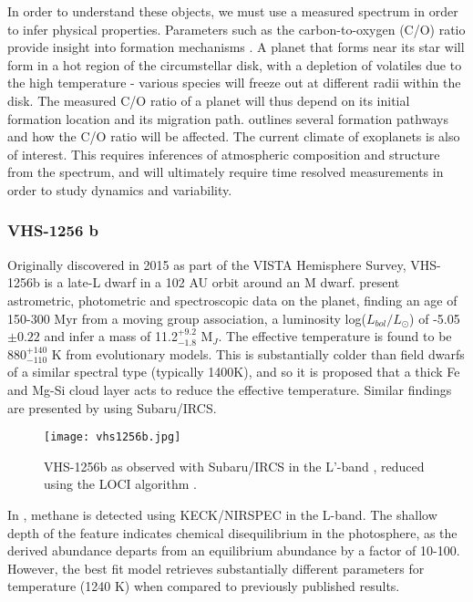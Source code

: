 In order to understand these objects, we must use a measured spectrum in order to infer physical properties.
Parameters such as the carbon-to-oxygen (C/O) ratio provide insight into formation mechanisms \parencite{Madhusudhan2012}.
A planet that forms near its star will form in a hot region of the circumstellar disk, with a depletion of volatiles due to the high temperature - various species will freeze out at different radii within the disk. 
The measured C/O ratio of a planet will thus depend on its initial formation location and its migration path.
\parencite{Turrini2015} outlines several formation pathways and how the C/O ratio will be affected.
The current climate of exoplanets is also of interest. This requires inferences of atmospheric composition and structure from the spectrum, and will ultimately require time resolved measurements in order to study dynamics and variability. 


\subsubsection{VHS-1256 b}
Originally discovered in 2015 \parencite{Gauza2015} as part of the VISTA Hemisphere Survey, VHS-1256b is a late-L dwarf in a 102 AU orbit around an M dwarf.
\parencite{Gauza2015} present astrometric, photometric and spectroscopic data on the planet, finding an age of 150-300 Myr from a moving group association, a luminosity log($L_{bol}/L_{\odot}$) of -5.05$\pm0.22$ and infer a mass of 11.2$^{+9.2}_{-1.8}$ M$_{J}$. 
The effective temperature is found to be 880$^{+140}_{-110}$ K from evolutionary models. 
This is substantially colder than field dwarfs of a similar spectral type (typically 1400K), and so it is proposed that a thick Fe and Mg-Si cloud layer acts to reduce the effective temperature.
Similar findings are presented by \parencite{Rich2016} using Subaru/IRCS.
\begin{wrapfigure}{r}{5.5cm}
	\centering
	\texttt{[image: vhs1256b.jpg]}
	\caption{VHS-1256b as observed with Subaru/IRCS in the L'-band \parencite{Rich2016}, reduced using the LOCI algorithm \parencite{Galicher2011}.}
\end{wrapfigure}

In \parencite{Miles2018}, methane is detected using KECK/NIRSPEC in the L-band. 
The shallow depth of the feature indicates chemical disequilibrium in the photosphere, as the derived abundance departs from an equilibrium abundance by a factor of 10-100.
However, the best fit model retrieves substantially different parameters for temperature (1240 K) when compared to previously published results.

